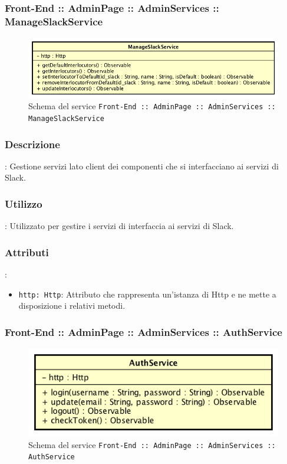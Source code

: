 \documentclass[../ManualeSviluppatore_v1.0.0.tex]{subfiles}
\begin{document}
     	 		\subsubsection{Front-End :: AdminPage :: AdminServices :: ManageSlackService}
				\begin{figure}[!h]
					\centering
					\includegraphics[scale=0.6]{Architettura/Front-End/AdminPage/AdminServices/ManageSlackService.png}
					\caption{Schema del service \texttt{Front-End :: AdminPage :: AdminServices :: ManageSlackService}}
				\end{figure}

				\subsubsection{Descrizione}: Gestione servizi lato client dei componenti che si interfacciano ai servizi di Slack.
				\subsubsection{Utilizzo}: Utilizzato per gestire i servizi di interfaccia ai servizi di Slack.
				\subsubsection{Attributi}:
				\begin{itemize}
					\item \texttt{http: Http}: Attributo che rappresenta un'istanza di Http e ne mette a disposizione i relativi metodi.
				\end{itemize}
\newpage
		      	\subsubsection{Front-End :: AdminPage :: AdminServices :: AuthService}
				\begin{figure}[!h]
					\centering
					\includegraphics[scale=0.6]{Architettura/Front-End/AdminPage/AdminServices/AuthService.png}
					\caption{Schema del service \texttt{Front-End :: AdminPage :: AdminServices :: AuthService}}
				\end{figure}
\end{document}

